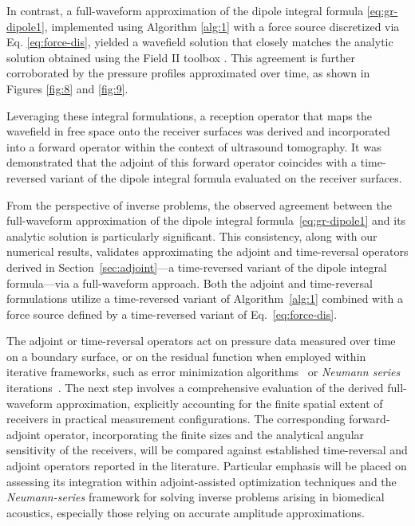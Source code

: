 \documentclass[11pt,reqno]{amsart}
\theoremstyle{remark}
\theoremstyle{italic_lemma}
\begin{document}


In contrast, a full-waveform approximation of the dipole integral formula \eqref{eq:gr-dipole1}, implemented using Algorithm \ref{alg:1} with a force source discretized via Eq. \eqref{eq:force-dis}, yielded a wavefield solution that closely matches the analytic solution obtained using the Field II toolbox \cite{Jensen1,Jensen2}. This agreement is further corroborated by the pressure profiles approximated over time, as shown in Figures \ref{fig:8} and \ref{fig:9}.

Leveraging these integral formulations, a reception operator that maps the wavefield in free space onto the receiver surfaces was derived and incorporated into a forward operator within the context of ultrasound tomography. It was demonstrated that the adjoint of this forward operator coincides with a time-reversed variant of the dipole integral formula evaluated on the receiver surfaces.

From the perspective of inverse problems, the observed agreement between the full-waveform approximation of the dipole integral formula~\eqref{eq:gr-dipole1} and its analytic solution is particularly significant. This consistency, along with our numerical results, validates approximating the adjoint and time-reversal operators derived in Section~\ref{sec:adjoint}—a time-reversed variant of the dipole integral formula—via a full-waveform approach. Both the adjoint and time-reversal formulations utilize a time-reversed variant of Algorithm~\ref{alg:1} combined with a force source defined by a time-reversed variant of Eq.~\eqref{eq:force-dis}.


The adjoint or time-reversal operators act on pressure data measured over time on a boundary surface, or on the residual function when employed within iterative frameworks, such as error minimization algorithms~\cite{Dean-Ben,Datchev,Arridge,Javaherian1} or \textit{Neumann series} iterations~\cite{Qian,Haltmeier2}. The next step involves a comprehensive evaluation of the derived full-waveform approximation, explicitly accounting for the finite spatial extent of receivers in practical measurement configurations. The corresponding forward-adjoint operator, incorporating the finite sizes and the analytical angular sensitivity of the receivers, will be compared against established time-reversal and adjoint operators reported in the literature. Particular emphasis will be placed on assessing its integration within adjoint-assisted optimization techniques and the \textit{Neumann-series} framework for solving inverse problems arising in biomedical acoustics, especially those relying on accurate amplitude approximations.
\end{document}
